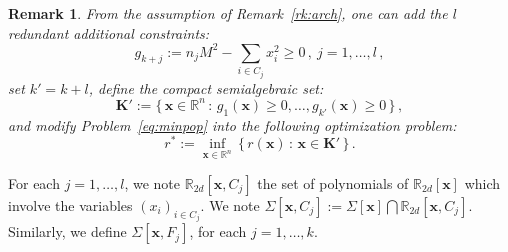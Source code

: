 \documentclass[preprint]{sigplanconf}
\newcommand{\mons}[2]{\N_{#1}^{#2}}
\newcommand{\R}{\mathbb{R}}
\newcommand{\N}{\mathbb{N}}
\newcommand{\x}{\mathbf{x}}
\def\K{\mathbf{K}}
\theoremstyle{plain}
\newtheorem{remark}{Remark}
\begin{document}
\begin{remark}
\label{rk:sparsearch}
From the assumption of Remark~\ref{rk:arch}, one can add the $l$ redundant additional constraints:
\begin{equation}
\label{eq:assum_sos_sparse}
g_{k + j} := n_j M^2 - \sum_{i \in C_j} {x_i^2} \geq 0\,, \  j=1 ,\dots, l \,,
\end{equation}
set $k' = k + l$, define the compact semialgebraic set:
\[\K' := \{\, \x \in \R^n \, : \, g_1 (\x) \geq 0, \dots, g_{k'} (\x) \geq 0 \,\} \,,\]
and modify Problem~\eqref{eq:minpop} into the following optimization problem:
\begin{equation}
\label{eq:sparseminpop}
r^*  :=  \inf_{\x \in \R^n} \, \{ \, r (\x) \, : \, \x \in \K' \, \} \,.
\end{equation}
\end{remark}
For each $j=1 ,\dots,l$, we note $\R_{2 d}[\x, C_j]$ the set of polynomials of $\R_{2 d}[\x]$ which involve the variables $(x_i)_{i \in C_j}$. We note $\Sigma [\x, C_j] := \Sigma [\x] \bigcap \R_{2 d}[\x, C_j]$. Similarly, we define $\Sigma [\x, F_j]$, for each $j=1, \dots, k$.
\end{document}
